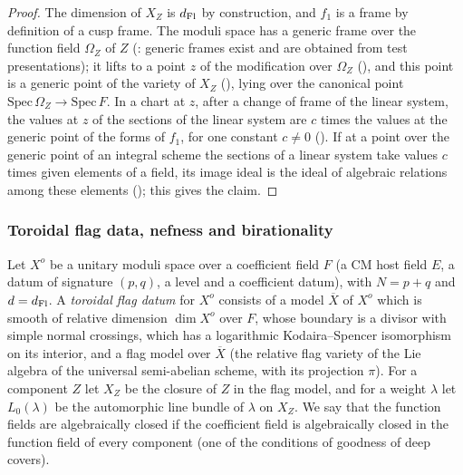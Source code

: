\begin{proof}
The dimension of $X_Z$ is $d_{\mathrm{Fl}}$ by construction, and $f_1$ is a frame by definition of a cusp frame. The moduli space
has a generic frame over the function field $\Omega_Z$ of $Z$ (:
generic frames exist and are obtained from test presentations); it lifts to a point $z$ of the modification over
$\Omega_Z$ (), and this point is a generic point of the variety of $X_Z$
(), lying over the canonical point $\mathrm{Spec}\,\Omega_Z\to
\mathrm{Spec}\,F$. In a chart at $z$, after a change of frame of the linear system, the values at $z$ of the sections of
the linear system are $c$ times the values at the generic point of the forms of $f_1$, for one constant $c\ne0$
(). If at a point over the generic point of an integral scheme the
sections of a linear system take values $c$ times given elements of a field, its image ideal is the ideal of algebraic
relations among these elements (); this gives the
claim.
\end{proof}

\subsubsection*{Toroidal flag data, nefness and birationality}

\begin{definition}\label{pf:lift2:def:torflag}
Let $X^o$ be a unitary moduli space over a coefficient field $F$ (a CM host field $E$, a datum of signature $(p,q)$, a
level and a coefficient datum), with $N=p+q$ and $d=d_{\mathrm{Fl}}$. A \emph{toroidal flag datum} for $X^o$ consists of a
model $\overline X$ of $X^o$ which is smooth of relative dimension $\dim X^o$ over $F$, whose boundary is a divisor with
simple normal crossings, which has a logarithmic Kodaira--Spencer isomorphism on its interior, and a flag model over
$\overline X$ (the relative flag variety of the Lie algebra of the universal semi-abelian scheme, with its projection
$\pi$). For a component $Z$ let $X_Z$ be the closure of $Z$ in the flag model, and for a weight $\lambda$ let $L_0(\lambda)$ be
the automorphic line bundle of $\lambda$ on $X_Z$. We say that the function fields are algebraically closed if the
coefficient field is algebraically closed in the function field of every component (one of the conditions of
goodness of deep covers).
\end{definition}

